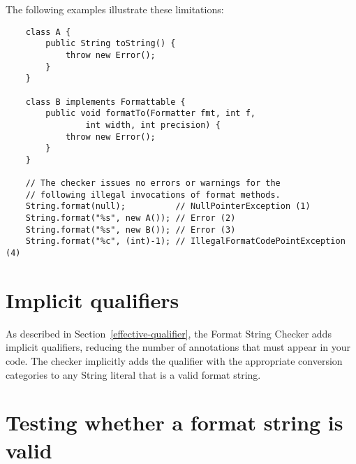 \noindent The following examples illustrate these limitations:

\begin{Verbatim}
    class A {
        public String toString() {
            throw new Error();
        }
    }

    class B implements Formattable {
        public void formatTo(Formatter fmt, int f, 
                int width, int precision) {
            throw new Error();
        }
    }

    // The checker issues no errors or warnings for the
    // following illegal invocations of format methods.
    String.format(null);          // NullPointerException (1)
    String.format("%s", new A()); // Error (2)
    String.format("%s", new B()); // Error (3)
    String.format("%c", (int)-1); // IllegalFormatCodePointException (4)
\end{Verbatim}

% 
% 


\section{Implicit qualifiers\label{formatter-implicit}}

As described in Section~\ref{effective-qualifier}, the Format String Checker adds implicit
qualifiers, reducing the number of annotations that must appear in your code.
The checker implicitly adds the  qualifier with the appropriate
conversion categories to any String literal that is a valid format string.

\section{Testing whether a format string is valid\label{formatter-run-time-tests}}

